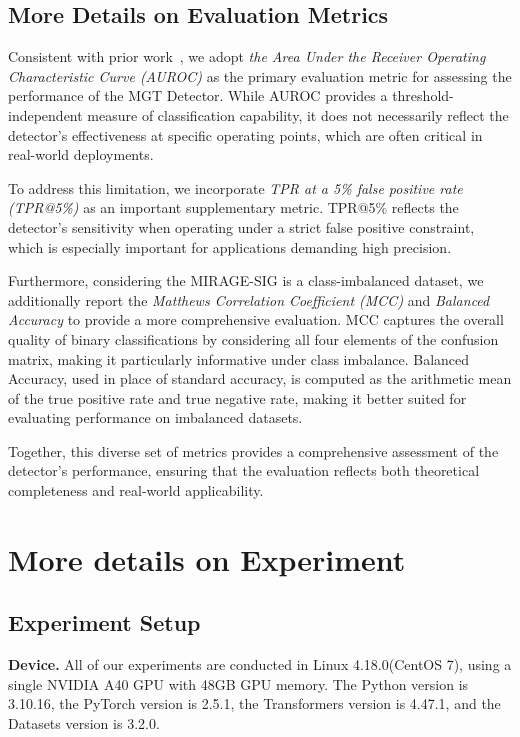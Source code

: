 \documentclass[sigconf, screen, review, anonymous]{acmart}
\begin{document}
\begin{table*}[t]
{\begin{tabular}{l|ccccccccccccccc}
    \hline

    \hline
    \end{tabular}
    }
    \label{tab:detail_ablation_beta}
\end{table*}

\subsection{More Details on  Evaluation Metrics}
Consistent with prior work~\cite{fastdetectgpt, imbd}, we adopt \textit{the Area Under the Receiver Operating Characteristic Curve (AUROC)} as the primary evaluation metric for assessing the performance of the MGT Detector.
%
While AUROC provides a threshold-independent measure of classification capability, it does not necessarily reflect the detector’s effectiveness at specific operating points, which are often critical in real-world deployments.

To address this limitation, we incorporate \textit{TPR at a 5\% false positive rate (TPR@5\%)} as an important supplementary metric.
%
TPR@5\% reflects the detector’s sensitivity when operating under a strict false positive constraint, which is especially important for applications demanding high precision.

Furthermore, considering the MIRAGE-SIG is a class-imbalanced dataset, we additionally report the \textit{Matthews Correlation Coefficient (MCC)} and \textit{Balanced Accuracy} to provide a more comprehensive evaluation.
%
MCC captures the overall quality of binary classifications by considering all four elements of the confusion matrix, making it particularly informative under class imbalance.
%
Balanced Accuracy, used in place of standard accuracy, is computed as the arithmetic mean of the true positive rate and true negative rate, making it better suited for evaluating performance on imbalanced datasets.

Together, this diverse set of metrics provides a comprehensive assessment of the detector's performance, ensuring that the evaluation reflects both theoretical completeness and real-world applicability.

\section{More details on Experiment}
\subsection{Experiment Setup}
\noindent \textbf{Device. }
All of our experiments are conducted in Linux 4.18.0(CentOS 7), using a single NVIDIA A40 GPU with 48GB GPU memory.
%
The Python version is 3.10.16, the PyTorch version is 2.5.1, the Transformers version is 4.47.1, and the Datasets version is 3.2.0.
\end{document}
